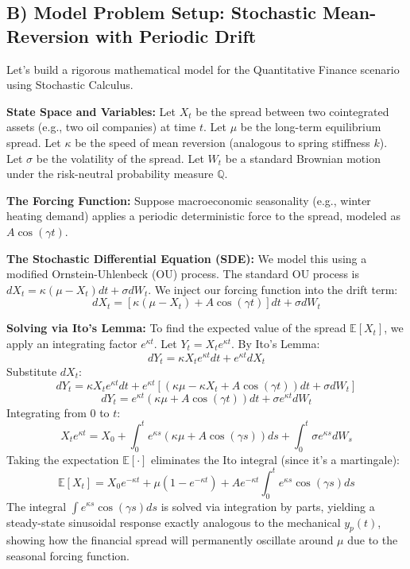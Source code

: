 \documentclass[11pt]{article}
\begin{document}
\subsection{B) Model Problem Setup: Stochastic Mean-Reversion with Periodic Drift}
Let's build a rigorous mathematical model for the Quantitative Finance scenario using Stochastic Calculus.

\textbf{State Space and Variables:}
Let $X_t$ be the spread between two cointegrated assets (e.g., two oil companies) at time $t$.
Let $\mu$ be the long-term equilibrium spread.
Let $\kappa$ be the speed of mean reversion (analogous to spring stiffness $k$).
Let $\sigma$ be the volatility of the spread.
Let $W_t$ be a standard Brownian motion under the risk-neutral probability measure $\mathbb{Q}$.

\textbf{The Forcing Function:}
Suppose macroeconomic seasonality (e.g., winter heating demand) applies a periodic deterministic force to the spread, modeled as $A \cos(\gamma t)$.

\textbf{The Stochastic Differential Equation (SDE):}
We model this using a modified Ornstein-Uhlenbeck (OU) process. The standard OU process is $dX_t = \kappa(\mu - X_t)dt + \sigma dW_t$. We inject our forcing function into the drift term:
\[ dX_t = \left[ \kappa(\mu - X_t) + A \cos(\gamma t) \right] dt + \sigma dW_t \]

\textbf{Solving via Ito's Lemma:}
To find the expected value of the spread $\mathbb{E}[X_t]$, we apply an integrating factor $e^{\kappa t}$. Let $Y_t = X_t e^{\kappa t}$. By Ito's Lemma:
\[ dY_t = \kappa X_t e^{\kappa t} dt + e^{\kappa t} dX_t \]
Substitute $dX_t$:
\[ dY_t = \kappa X_t e^{\kappa t} dt + e^{\kappa t} \left[ (\kappa\mu - \kappa X_t + A \cos(\gamma t)) dt + \sigma dW_t \right] \]
\[ dY_t = e^{\kappa t} (\kappa\mu + A \cos(\gamma t)) dt + \sigma e^{\kappa t} dW_t \]
Integrating from $0$ to $t$:
\[ X_t e^{\kappa t} = X_0 + \int_0^t e^{\kappa s} (\kappa\mu + A \cos(\gamma s)) ds + \int_0^t \sigma e^{\kappa s} dW_s \]
Taking the expectation $\mathbb{E}[\cdot]$ eliminates the Ito integral (since it's a martingale):
\[ \mathbb{E}[X_t] = X_0 e^{-\kappa t} + \mu(1 - e^{-\kappa t}) + A e^{-\kappa t} \int_0^t e^{\kappa s} \cos(\gamma s) ds \]
The integral $\int e^{\kappa s} \cos(\gamma s) ds$ is solved via integration by parts, yielding a steady-state sinusoidal response exactly analogous to the mechanical $y_p(t)$, showing how the financial spread will permanently oscillate around $\mu$ due to the seasonal forcing function.
\end{document}
